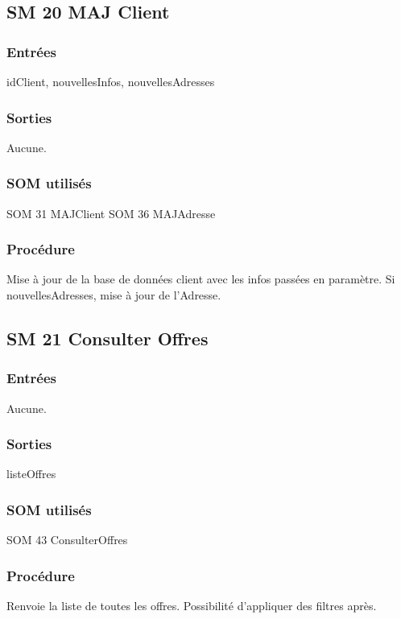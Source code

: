 \subsection{SM 20 MAJ Client}

\subsubsection{Entrées}
idClient, nouvellesInfos, nouvellesAdresses
\subsubsection{Sorties}
Aucune.
\subsubsection{SOM utilisés}
SOM 31 MAJClient
SOM 36 MAJAdresse
\subsubsection{Procédure}
Mise à jour de la base de données client avec les infos passées en paramètre.
Si nouvellesAdresses, mise à jour de l'Adresse.


\subsection{SM 21 Consulter Offres}

\subsubsection{Entrées}
Aucune.
\subsubsection{Sorties}
listeOffres
\subsubsection{SOM utilisés}
SOM 43 ConsulterOffres
\subsubsection{Procédure}
Renvoie la liste de toutes les offres.
Possibilité d'appliquer des filtres après.
